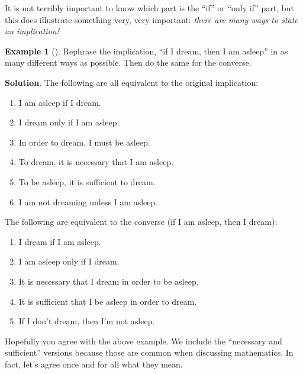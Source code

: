 \documentclass[10pt,]{book}
\theoremstyle{plain}
\theoremstyle{definition}
\theoremstyle{definition}
\newtheorem{example}[theorem]{Example}
\theoremstyle{definition}
\theoremstyle{definition}
\numberwithin{equation}{chapter}
\begin{document}
\hypertarget{p-1433}{}%
It is not terribly important to know which part is the ``if'' or ``only if'' part, but this does illustrate something very, very important: \emph{there are many ways to state an implication!}%
\begin{example}[]\label{example-37}
\hypertarget{p-1434}{}%
Rephrase the implication, ``if I dream, then I am asleep'' in as many different ways as possible. Then do the same for the converse.%
\par\smallskip%
\noindent\textbf{Solution}.\hypertarget{solution-123}{}\quad%
\hypertarget{p-1435}{}%
The following are all equivalent to the original implication: \leavevmode%
\begin{enumerate}
\item\hypertarget{li-305}{}\hypertarget{p-1436}{}%
I am asleep if I dream.%
\item\hypertarget{li-306}{}\hypertarget{p-1437}{}%
I dream only if I am asleep.%
\item\hypertarget{li-307}{}\hypertarget{p-1438}{}%
In order to dream, I must be asleep.%
\item\hypertarget{li-308}{}\hypertarget{p-1439}{}%
To dream, it is necessary that I am asleep.%
\item\hypertarget{li-309}{}\hypertarget{p-1440}{}%
To be asleep, it is sufficient to dream.%
\item\hypertarget{li-310}{}\hypertarget{p-1441}{}%
I am not dreaming unless I am asleep.%
\end{enumerate}
 The following are equivalent to the converse (if I am asleep, then I dream): \leavevmode%
\begin{enumerate}
\item\hypertarget{li-311}{}\hypertarget{p-1442}{}%
I dream if I am asleep.%
\item\hypertarget{li-312}{}\hypertarget{p-1443}{}%
I am asleep only if I dream.%
\item\hypertarget{li-313}{}\hypertarget{p-1444}{}%
It is necessary that I dream in order to be asleep.%
\item\hypertarget{li-314}{}\hypertarget{p-1445}{}%
It is sufficient that I be asleep in order to dream.%
\item\hypertarget{li-315}{}\hypertarget{p-1446}{}%
If I don't dream, then I'm not asleep.%
\end{enumerate}
%
\end{example}
\hypertarget{p-1447}{}%
Hopefully you agree with the above example. We include the ``necessary and sufficient'' versions because those are common when discussing mathematics. In fact, let's agree once and for all what they mean.%
\end{document}

